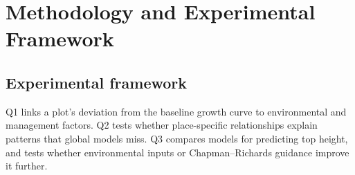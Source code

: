%

\chapter{Methodology and Experimental Framework} \label{ch:methodology}
\section{Experimental framework}
Q1 links a plot's deviation from the baseline growth curve to environmental and management factors. Q2 tests whether place-specific relationships explain patterns that global models miss. Q3 compares models for predicting top height, and tests whether environmental inputs or Chapman--Richards guidance improve it further.

